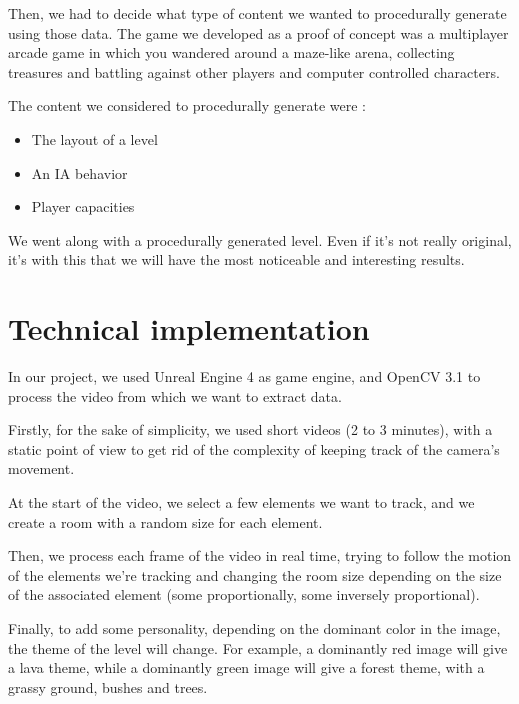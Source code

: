 \documentclass[conference]{acmsiggraph}
\begin{document}
Then, we had to decide what type of content we wanted to procedurally generate using those data.
The game we developed as a proof of concept was a multiplayer arcade game in which you wandered around a maze-like arena, collecting treasures and battling against other players and computer controlled characters.

The content we considered to procedurally generate were :
\begin{itemize}
	\item The layout of a level
	\item An IA behavior
	\item Player capacities
\end{itemize}

We went along with a procedurally generated level. Even if it's not really original, it's with this that we will have the most noticeable and interesting results.

\section{Technical implementation}

In our project, we used Unreal Engine 4 as game engine, and OpenCV 3.1 to process the video from which we want to extract data.

Firstly, for the sake of simplicity, we used short videos (2 to 3 minutes), with a static point of view to get rid of the complexity of keeping track of the camera's movement.

At the start of the video, we select a few elements we want to track, and we create a room with a random size for each element.

Then, we process each frame of the video in real time, trying to follow the motion of the elements we're tracking and changing the room size depending on the size of the associated element (some proportionally, some inversely proportional).

Finally, to add some personality, depending on the dominant color in the image, the theme of the level will change. For example, a dominantly red image will give a lava theme, while a dominantly green image will give a forest theme, with a grassy ground, bushes and trees.


\nocite{*}

\end{document}
